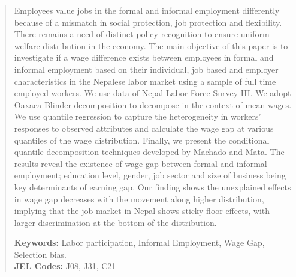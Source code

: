 \begin{abstract}	
\noindent Employees value jobs in the formal and informal employment differently because of a mismatch in social protection, job protection and flexibility. There remains a need of distinct policy recognition to ensure uniform welfare distribution in the economy. The main objective of this paper is to investigate if a wage difference exists between employees in formal and informal employment based on their individual, job based and employer characteristics in the Nepalese labor market using a sample of full time employed workers. We use data of Nepal Labor Force Survey III. We adopt Oaxaca-Blinder decomposition to decompose in the context of mean wages. We use quantile regression  to capture the heterogeneity in workers' responses to observed attributes and calculate the wage gap at various quantiles of the wage distribution. Finally, we present the conditional quantile decomposition techniques developed by Machado and Mata. The results reveal the existence of wage gap between formal and informal employment; education level, gender, job sector and size of business being key determinants of earning gap. Our finding shows the unexplained effects in wage gap decreases with the movement along higher distribution, implying that the job market in Nepal shows sticky floor effects, with larger discrimination at the bottom of the distribution.\par
\vspace{.1in}
\noindent\textbf{Keywords:} Labor participation, Informal Employment, Wage Gap, Selection bias.\\
\noindent\textbf{JEL Codes:} J08, J31, C21
\bigskip
\end{abstract}